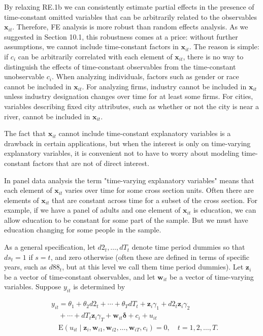 \documentclass[10pt]{article}
\begin{document}
By relaxing RE.1b we can consistently estimate partial effects in the presence of time-constant omitted variables that can be arbitrarily related to the observables $\mathbf{x}_{i t}$. Therefore, FE analysis is more robust than random effects analysis. As we suggested in Section 10.1, this robustness comes at a price: without further assumptions, we cannot include time-constant factors in $\mathbf{x}_{i t}$. The reason is simple: if $c_{i}$ can be arbitrarily correlated with each element of $\mathbf{x}_{i t}$, there is no way to distinguish the effects of time-constant observables from the time-constant unobservable $c_{i}$. When analyzing individuals, factors such as gender or race cannot be included in $\mathbf{x}_{i t}$. For analyzing firms, industry cannot be included in $\mathbf{x}_{i t}$ unless industry designation changes over time for at least some firms. For cities, variables describing fixed city attributes, such as whether or not the city is near a river, cannot be included in $\mathbf{x}_{i t}$.

The fact that $\mathbf{x}_{i t}$ cannot include time-constant explanatory variables is a drawback in certain applications, but when the interest is only on time-varying explanatory variables, it is convenient not to have to worry about modeling time-constant factors that are not of direct interest.

In panel data analysis the term "time-varying explanatory variables" means that each element of $\mathbf{x}_{i t}$ varies over time for some cross section units. Often there are elements of $\mathbf{x}_{i t}$ that are constant across time for a subset of the cross section. For example, if we have a panel of adults and one element of $\mathbf{x}_{i t}$ is education, we can allow education to be constant for some part of the sample. But we must have education changing for some people in the sample.

As a general specification, let $d 2_{t}, \ldots, d T_{t}$ denote time period dummies so that $d s_{t}=1$ if $s=t$, and zero otherwise (often these are defined in terms of specific years, such as $d 88_{t}$, but at this level we call them time period dummies). Let $\mathbf{z}_{i}$ be a vector of time-constant observables, and let $\mathbf{w}_{i t}$ be a vector of time-varying variables. Suppose $y_{i t}$ is determined by


\begin{align*}
& y_{i t}=\theta_{1}+\theta_{2} d 2_{t}+\cdots+\theta_{T} d T_{t}+\mathbf{z}_{i} \gamma_{1}+d 2_{t} \mathbf{z}_{i} \gamma_{2} \\
& \quad+\cdots+d T_{t} \mathbf{z}_{i} \gamma_{T}+\mathbf{w}_{i t} \boldsymbol{\delta}+c_{i}+u_{i t}  \tag{10.43}\\
& \quad \mathrm{E}\left(u_{i t} \mid \mathbf{z}_{i}, \mathbf{w}_{i 1}, \mathbf{w}_{i 2}, \ldots, \mathbf{w}_{i T}, c_{i}\right)=0, \quad t=1,2, \ldots, T . \tag{10.44}
\end{align*}
\end{document}
